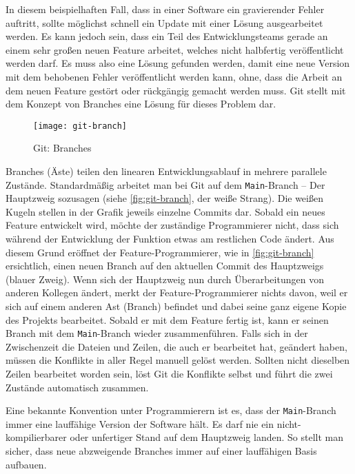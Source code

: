In diesem beispielhaften Fall, dass in einer Software ein gravierender Fehler
auftritt, sollte möglichst schnell ein Update mit einer Lösung ausgearbeitet
werden. Es kann jedoch sein, dass ein Teil des Entwicklungsteams gerade an einem
sehr großen neuen Feature arbeitet, welches nicht halbfertig veröffentlicht
werden darf. Es muss also eine Lösung gefunden werden, damit eine neue Version
mit dem behobenen Fehler veröffentlicht werden kann, ohne, dass die Arbeit an
dem neuen Feature gestört oder rückgängig gemacht werden muss. Git stellt mit
dem Konzept von Branches eine Lösung für dieses Problem dar.

\begin{figure}[h]
    \centering
    \texttt{[image: git-branch]}
    \caption{Git: Branches}
    \label{fig:git-branch}
\end{figure}

Branches (Äste) teilen den linearen Entwicklungsablauf in mehrere parallele
Zustände. Standardmäßig arbeitet man bei Git auf dem \texttt{Main}-Branch -- Der
Hauptzweig sozusagen (siehe \autoref{fig:git-branch}, der weiße Strang).
Die weißen Kugeln stellen in der Grafik jeweils einzelne Commits dar. Sobald ein
neues Feature entwickelt wird, möchte der zuständige Programmierer nicht, dass
sich während der Entwicklung der Funktion etwas am restlichen Code ändert. Aus
diesem Grund eröffnet der Feature-Programmierer, wie in \autoref{fig:git-branch}
ersichtlich, einen neuen Branch auf den aktuellen Commit des Hauptzweigs (blauer
Zweig). Wenn sich der Hauptzweig nun durch Überarbeitungen von anderen Kollegen
ändert, merkt der Feature-Programmierer nichts davon, weil er sich auf einem
anderen Ast (Branch) befindet und dabei seine ganz eigene Kopie des Projekts
bearbeitet. Sobald er mit dem Feature fertig ist, kann er seinen Branch mit dem
\texttt{Main}-Branch wieder zusammenführen. Falls sich in der Zwischenzeit die
Dateien und Zeilen, die auch er bearbeitet hat, geändert haben, müssen die
Konflikte in aller Regel manuell gelöst werden. Sollten nicht dieselben Zeilen
bearbeitet worden sein, löst Git die Konflikte selbst und führt die zwei
Zustände automatisch zusammen.

Eine bekannte Konvention unter Programmierern ist es, dass der
\texttt{Main}-Branch immer eine lauffähige Version der Software hält. Es darf
nie ein nicht-kompilierbarer oder unfertiger Stand auf dem Hauptzweig landen.
So stellt man sicher, dass neue abzweigende Branches immer auf einer
lauffähigen Basis aufbauen. \parencite{git-branches}


